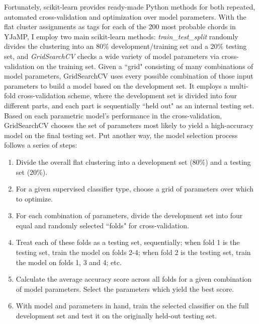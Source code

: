 Fortunately, scikit-learn provides ready-made Python methods for both repeated, automated cross-validation and optimization over model parameters.  With the flat cluster assignments as tags for each of the 200 most probable chords in YJaMP, I employ two main scikit-learn methods: \emph{train\_test\_split} randomly divides the clustering into an $80\%$ development/training set and a $20\%$ testing set, and \emph{GridSearchCV} checks a wide variety of model parameters via cross-validation on the training set.  Given a ``grid" consisting of many combinations of model parameters, GridSearchCV uses every possible combination of those input parameters to build a model based on the development set.  It employs a multi-fold cross-validation scheme, where the development set is divided into four different parts, and each part is sequentially ``held out" as an internal testing set.  Based on each parametric model's performance in the cross-validation, GridSearchCV chooses the set of parameters most likely to yield a high-accuracy model on the final testing set.  Put another way, the model selection process follows a series of steps:

\begin{enumerate}
	\item Divide the overall flat clustering into a development set ($80\%$) and a testing set ($20\%$).
	\item For a given supervised classifier type, choose a grid of parameters over which to optimize.
	\item For each combination of parameters, divide the development set into four equal and randomly selected ``folds" for cross-validation.
	\item Treat each of these folds as a testing set, sequentially; when fold 1 is the testing set, train the model on folds 2-4; when fold 2 is the testing set, train the model on folds 1, 3 and 4; etc.
	\item Calculate the average accuracy score across all folds for a given combination of model parameters.  Select the parameters which yield the best score.
	\item With model and parameters in hand, train the selected classifier on the full development set and test it on the originally held-out testing set.
\end{enumerate}





